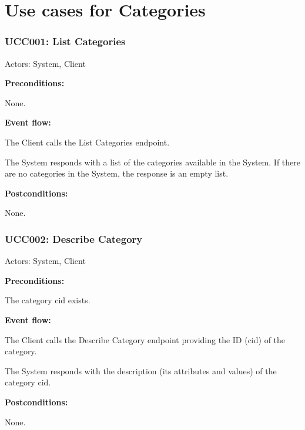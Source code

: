 \section{Use cases for Categories}

\begin{ucbox}{\subsubsection{UCC001: List Categories}}
\label{UCC001}

Actors: System, Client

\textbf{Preconditions:}

\ucitem None.

\textbf{Event flow:}

\ucitem The Client calls the List Categories endpoint.

\ucitem The System responds with a list of the categories available in the System. If there are no categories in the System, the response is an empty list.

\textbf{Postconditions:}

\ucitem None.

\end{ucbox}

\begin{ucbox}{\subsubsection{UCC002: Describe Category}}
\label{UCC002}

Actors: System, Client

\textbf{Preconditions:}

\ucitem The category cid exists.

\textbf{Event flow:}

\ucitem The Client calls the Describe Category endpoint providing the ID (cid) of the category.

\ucitem The System responds with the description (its attributes and values) of the category cid.

\textbf{Postconditions:}

\ucitem None.

\end{ucbox}


